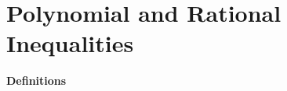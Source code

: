 \chapter{Polynomial and Rational Inequalities}\label{chap:PolyRatIneq}
\begin{genericFrame}[frametitle={~New Things\hbox{~}}]
    \textbf{\Large\sffamily Definitions}
    \begin{description}[style=nextline]
        \item[Polynomial Expression]
        \item[Polynomial Inequality]
        \item[Rational Expression]
        \item[Rational Inequalities]
    \end{description}
\end{genericFrame}
